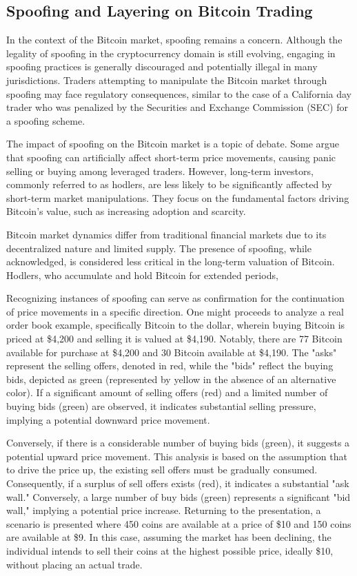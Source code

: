 \subsection{Spoofing and Layering on Bitcoin Trading}
In the context of the Bitcoin market, spoofing remains a concern. Although the legality of spoofing in the cryptocurrency
domain is still evolving, engaging in spoofing practices is generally discouraged and potentially illegal in many jurisdictions.
Traders attempting to manipulate the Bitcoin market through spoofing may face regulatory consequences, similar to the case
of a California day trader who was penalized by the Securities and Exchange Commission (SEC) for a spoofing scheme.

The impact of spoofing on the Bitcoin market is a topic of debate. Some argue that spoofing can artificially affect
short-term price movements, causing panic selling or buying among leveraged traders. However, long-term investors,
commonly referred to as hodlers, are less likely to be significantly affected by short-term market manipulations. They
focus on the fundamental factors driving Bitcoin's value, such as increasing adoption and scarcity.

Bitcoin market dynamics differ from traditional financial markets due to its decentralized nature and limited supply.
The presence of spoofing, while acknowledged, is considered less critical in the long-term valuation of Bitcoin. Hodlers,
who accumulate and hold Bitcoin for extended periods,

Recognizing instances of spoofing can serve as confirmation for the continuation of price movements in a specific direction.
One might proceeds to analyze a real order book example, specifically Bitcoin to the dollar, wherein buying Bitcoin is priced
at \$4,200 and selling it is valued at \$4,190. Notably, there are 77 Bitcoin available for purchase at \$4,200 and 30
Bitcoin available at \$4,190. The "asks" represent the selling offers, denoted in red, while the "bids" reflect the buying
bids, depicted as green (represented by yellow in the absence of an alternative color). If a significant amount of selling
offers (red) and a limited number of buying bids (green) are observed, it indicates substantial selling pressure, implying
a potential downward price movement.

Conversely, if there is a considerable number of buying bids (green), it suggests a potential upward price movement. This
analysis is based on the assumption that to drive the price up, the existing sell offers must be gradually consumed.
Consequently, if a surplus of sell offers exists (red), it indicates a substantial "ask wall." Conversely, a large number
of buy bids (green) represents a significant "bid wall," implying a potential price increase. Returning to the presentation,
a scenario is presented where 450 coins are available at a price of \$10 and 150 coins are available at \$9. In this case,
assuming the market has been declining, the individual intends to sell their coins at the highest possible price, ideally
\$10, without placing an actual trade.

